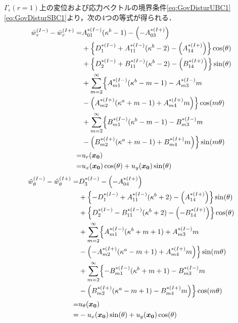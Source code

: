 $\Gamma_{\epsilon}(r=1)$上の変位および応力ベクトルの境界条件\eqref{eq:GovDisturUBC1}\eqref{eq:GovDisturSBC1}より，次の4つの等式が得られる．
\begin{align}
	\hat{w}_{r}^{(I-)}-\hat{w}_{r}^{(I+)} =&A_{01}^{*(I-)}(\kappa^{b}-1)-\Bigl(-A_{03}^{*(I+)}\Bigr)
	\nonumber
	\\
	&+\Bigl\{D_{1}^{*(I-)}+A_{11}^{*(I-)}(\kappa^{b}-2)
	-\Bigl(A_{14}^{*(I+)}\Bigr)\Bigr\}\cos(\theta)
	\nonumber
	\\
	&+\Bigl\{D_{2}^{*(I-)}+B_{11}^{*(I-)}(\kappa^{b}-2)
	-\Bigl(B_{14}^{*(I+)}\Bigr)\Bigr\}\sin(\theta)
	\nonumber
	\\
	&+\sum_{m=2}^{\infty}\Bigl\{A_{m1}^{*(I-)}(\kappa^{b}-m-1)
	-A_{m3}^{*(I-)}m
	\nonumber
	\\
	&-\Bigl(A_{m2}^{*(I+)}(\kappa^{a}+m-1)
	+A_{m4}^{*(I+)}m\Bigr)\Bigr\}\cos(m\theta)
	\nonumber
	\\
	&+\sum_{m=2}^{\infty}\Bigl\{B_{m1}^{*(I-)}(\kappa^{b}-m-1)
	-B_{m3}^{*(I-)}m
	\nonumber
	\\
	&-\Bigl(B_{m2}^{*(I+)}(\kappa^{a}+m-1)
	+B_{m4}^{*(I+)}m\Bigr)\Bigr\}\sin(m\theta)
	\nonumber
	\\
	=&u_{r}(\bm{x_{0}})
	\nonumber
	\\
	=&u_{x}(\bm{x_{0}})\cos(\theta)+u_{y}(\bm{x_{0}})\sin(\theta)
	\label{eq:UR1eq}
\end{align}
\begin{align}
	\hat{w}_{\theta}^{(I-)}-\hat{w}_{\theta}^{(I+)} =&D_{3}^{*(I-)}-\Bigl(-A_{04}^{*(I+)}\Bigr)
	\nonumber
	\\
	&+\Bigl\{-D_{1}^{*(I-)}+A_{11}^{*(I-)}(\kappa^{b}+2)
	-\Bigl(A_{14}^{*(I+)}\Bigr)\Bigr\}\sin(\theta)
	\nonumber
	\\
	&+\Bigl\{D_{2}^{*(I-)}-B_{11}^{*(I-)}(\kappa^{b}+2)
	-\Bigl(-B_{14}^{*(I+)}\Bigr)\Bigr\}\cos(\theta)
	\nonumber
	\\
	&+\sum_{m=2}^{\infty}\Bigl\{A_{m1}^{*(I-)}(\kappa^{b}+m+1)
	+A_{m3}^{*(I-)}m
	\nonumber
	\\
	&-\Bigl(-A_{m2}^{*(I+)}(\kappa^{a}-m+1)
	+A_{m4}^{*(I+)}m\Bigr)\Bigr\}\sin(m\theta)
	\nonumber
	\\
	&+\sum_{m=2}^{\infty}\Bigl\{-B_{m1}^{*(I-)}(\kappa^{b}+m+1)
	-B_{m3}^{*(I-)}m
	\nonumber
	\\
	&-\Bigl(B_{m2}^{*(I+)}(\kappa^{a}-m+1)
	-B_{m4}^{*(I+)}m\Bigr)\Bigr\}\cos(m\theta)
	\nonumber
	\\
	=&u_{\theta}(\bm{x_{0}})
	\nonumber
	\\
	=&-u_{x}(\bm{x_{0}})\sin(\theta)+u_{y}(\bm{x_{0}})\cos(\theta)
	\label{eq:UTh1eq}
\end{align}
